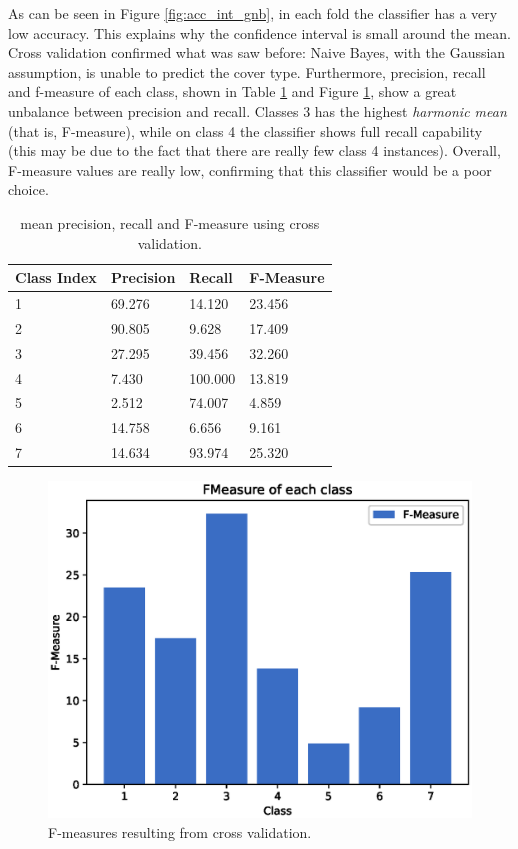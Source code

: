 \documentclass[a4paper, 10pt]{article}
\begin{document}
As can be seen in Figure \ref{fig:acc_int_gnb}, in each fold the classifier has a very low accuracy. This explains why the confidence interval is small around the mean. Cross validation confirmed what was saw before: Naive Bayes, with the Gaussian assumption, is unable to predict the cover type. Furthermore, precision, recall and f-measure of each class, shown in Table \ref{tab:gnb_pr} and Figure \ref{fig:gnb_fmeasure}, show a great unbalance between precision and recall. Classes 3 has the highest \emph{harmonic mean} (that is, F-measure), while on class 4 the classifier shows full recall capability (this may be due to the fact that there are really few class 4 instances). Overall, F-measure values are really low, confirming that this classifier would be a poor choice.
\begin{table}[h!]
\centering
\begin{tabular}{|l|l|l|l|}
\hline
\textbf{Class Index} & \textbf{Precision} & \textbf{Recall} & \textbf{F-Measure}\\\hline
1 & 69.276 & 14.120& 23.456\\\hline
2 & 90.805 & 9.628& 17.409\\\hline
3 & 27.295 & 39.456& 32.260\\\hline
4 & 7.430 & 100.000& 13.819\\\hline
5 & 2.512 & 74.007& 4.859\\\hline
6 & 14.758 & 6.656& 9.161\\\hline
7 & 14.634 & 93.974& 25.320\\\hline
\end{tabular}
\caption{mean precision, recall and F-measure using cross validation.}
\label{tab:gnb_pr}
\end{table}

\begin{figure}[h!]
 \centering
 \includegraphics[width=0.8\linewidth]{pictures/nb_gaussian_fmeasure.eps}
 \caption{F-measures resulting from cross validation.}
 \label{fig:gnb_fmeasure}
\end{figure}
\end{document}
